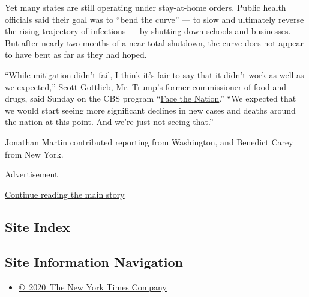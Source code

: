Yet many states are still operating under stay-at-home orders. Public
health officials said their goal was to ``bend the curve'' --- to slow
and ultimately reverse the rising trajectory of infections --- by
shutting down schools and businesses. But after nearly two months of a
near total shutdown, the curve does not appear to have bent as far as
they had hoped.

``While mitigation didn't fail, I think it's fair to say that it didn't
work as well as we expected,'' Scott Gottlieb, Mr. Trump's former
commissioner of food and drugs, said Sunday on the CBS program
``\href{https://www.cbsnews.com/news/transcript-scott-gottlieb-discusses-coronavirus-on-face-the-nation-may-3-2020/}{Face
the Nation}.'' ``We expected that we would start seeing more significant
declines in new cases and deaths around the nation at this point. And
we're just not seeing that.''

Jonathan Martin contributed reporting from Washington, and Benedict
Carey from New York.

Advertisement

\protect\hyperlink{after-bottom}{Continue reading the main story}

\hypertarget{site-index}{%
\subsection{Site Index}\label{site-index}}

\hypertarget{site-information-navigation}{%
\subsection{Site Information
Navigation}\label{site-information-navigation}}

\begin{itemize}
\tightlist
\item
  \href{https://help.nytimes3xbfgragh.onion/hc/en-us/articles/115014792127-Copyright-notice}{©~2020~The
  New York Times Company}
\end{itemize}

